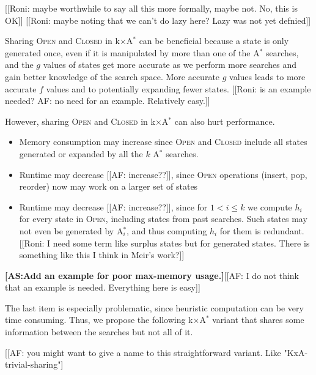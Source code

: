 \documentclass[twoside,11pt]{article}
\newcommand{\astar}{A$^*$\xspace}
\newcommand{\kxastar}{k$\times$A$^*$\xspace}
\newcommand{\astari}[1]{A$^*_#1$\xspace}
\newcommand{\open}{\textsc{Open}\xspace}
\newcommand{\closed}{\textsc{Closed}\xspace}
\newcommand{\abda}[1]{\textbf{[AS:#1]}}
\begin{document}
[[Roni: maybe worthwhile to say all this more formally, maybe not. No, this is OK]]
[[Roni: maybe noting that we can't do lazy here? Lazy was not yet defnied]]

Sharing \open and \closed in \kxastar can be beneficial because a state is only generated once, even if it is manipulated by more than one of the \astar searches, and the $g$ values of states get more accurate as we perform more searches and gain better knowledge of the search space.
More accurate $g$ values leads to more accurate $f$ values and to potentially expanding fewer states. [[Roni: is an example needed? AF: no need for an example. Relatively easy.]]

However, sharing \open and \closed in \kxastar can also hurt performance.
\begin{itemize}
\item Memory consumption may increase since \open and \closed include all states generated or expanded by all the $k$ \astar searches.
\item Runtime may decrease [[AF: increase??]], since \open operations (insert, pop, reorder) now may work on a larger set of states
\item Runtime may decrease  [[AF: increase??]], since for $1<i\leq k$ we compute $h_i$ for every state in \open, including states from past searches.
Such states may not even be generated by \astari{i}, and thus computing $h_i$ for them is redundant.
[[Roni: I need some term like surplus states but for generated states. There is something like this I think in Meir's work?]]
\end{itemize}

\abda{Add an example for poor max-memory usage.}[[AF: I do not think that an example is needed. Everything here is easy]]

The last item is especially problematic, since heuristic computation can be very time consuming.
Thus, we propose the following \kxastar variant that shares some information between the searches but not all of it.

[[AF: you might want to give a name to this straightforward variant. Like "KxA-trivial-sharing"]


\end{document}
